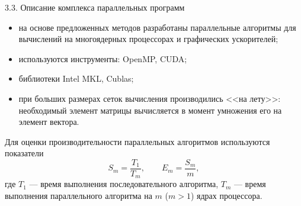 \documentclass[10pt,pdf, mathserif, hyperref={unicode}]{beamer}
\begin{document}
%		

\begin{frame}{3.3. Описание комплекса параллельных программ}
	\begin{itemize}
		\item на основе предложенных методов разработаны параллельные алгоритмы для вычислений на многоядерных процессорах и графических ускорителей;
		\item используются инструменты: OpenMP, CUDA;
		\item библиотеки Intel MKL, Cublas;
		\item при больших размерах сеток вычисления производились <<на лету>>: необходимый элемент матрицы вычисляется в момент умножения его на элемент вектора.
	\end{itemize}
	
	Для оценки производительности параллельных алгоритмов используются показатели {}
	$$
	S_m=\frac{T_1}{T_m},\quad
	\quad E_m=\frac{S_m}{m}, $$
	где $T_1$ --- время выполнения последовательного алгоритма,
	$T_m$ --- время выполнения параллельного алгоритма на $m$ ($m>1$) ядрах процессора.
\end{frame}
\end{document}
